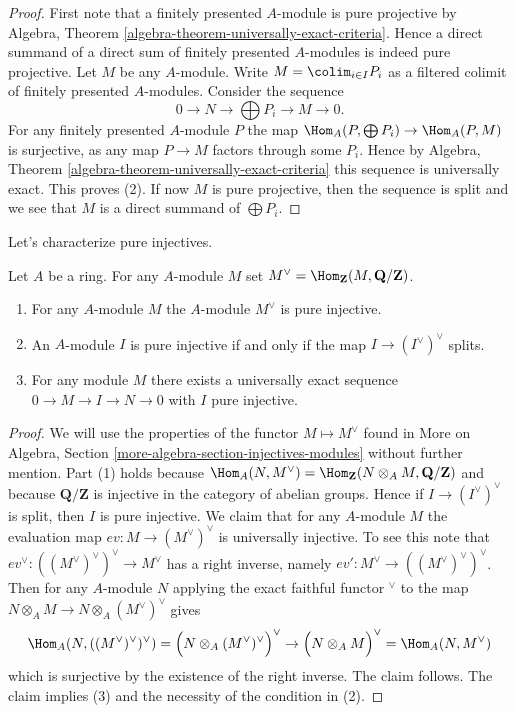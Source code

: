 \begin{proof}
First note that a finitely presented $A$-module is pure projective by
Algebra, Theorem \ref{algebra-theorem-universally-exact-criteria}.
Hence a direct summand of a direct sum of finitely presented $A$-modules
is indeed pure projective. Let $M$ be any $A$-module.
Write $M = \colim_{i \in I} P_i$ as a filtered colimit of
finitely presented $A$-modules. Consider the sequence
$$
0 \to N \to \bigoplus P_i \to M \to 0.
$$
For any finitely presented $A$-module $P$ the map
$\Hom_A(P, \bigoplus P_i) \to \Hom_A(P, M)$
is surjective, as any map $P \to M$ factors through some $P_i$.
Hence by
Algebra, Theorem \ref{algebra-theorem-universally-exact-criteria}
this sequence is universally exact. This proves (2).
If now $M$ is pure projective, then the sequence is split and
we see that $M$ is a direct summand of $\bigoplus P_i$.
\end{proof}

\noindent
Let's characterize pure injectives.

\begin{lemma}
\label{lemma-pure-injective}
Let $A$ be a ring. For any $A$-module $M$ set
$M^\vee = \Hom_\mathbf{Z}(M, \mathbf{Q}/\mathbf{Z})$.
\begin{enumerate}
\item For any $A$-module $M$ the $A$-module $M^\vee$ is pure injective.
\item An $A$-module $I$ is pure injective if and only if the map
$I \to (I^\vee)^\vee$ splits.
\item For any module $M$ there exists a universally exact sequence
$0 \to M \to I \to N \to 0$ with $I$ pure injective.
\end{enumerate}
\end{lemma}

\begin{proof}
We will use the properties of the functor $M \mapsto M^\vee$ found in
More on Algebra, Section \ref{more-algebra-section-injectives-modules}
without further mention. Part (1) holds because
$\Hom_A(N, M^\vee) =
\Hom_\mathbf{Z}(N \otimes_A M, \mathbf{Q}/\mathbf{Z})$
and because $\mathbf{Q}/\mathbf{Z}$ is injective in the category of
abelian groups. Hence if $I \to (I^\vee)^\vee$ is split, then
$I$ is pure injective. We claim that for any $A$-module $M$ the
evaluation map $ev : M \to (M^\vee)^\vee$ is universally injective.
To see this note that $ev^\vee : ((M^\vee)^\vee)^\vee \to M^\vee$
has a right inverse, namely $ev' : M^\vee \to ((M^\vee)^\vee)^\vee$.
Then for any $A$-module $N$ applying the exact faithful functor
${}^\vee$ to the map $N \otimes_A M \to N \otimes_A (M^\vee)^\vee$
gives
$$
\Hom_A(N, ((M^\vee)^\vee)^\vee) =
\Big(N \otimes_A (M^\vee)^\vee\Big)^\vee
\to
\Big(N \otimes_A M\Big)^\vee =
\Hom_A(N, M^\vee)
$$
which is surjective by the existence of the right inverse. The claim follows.
The claim implies (3) and the necessity of the condition in (2).
\end{proof}

